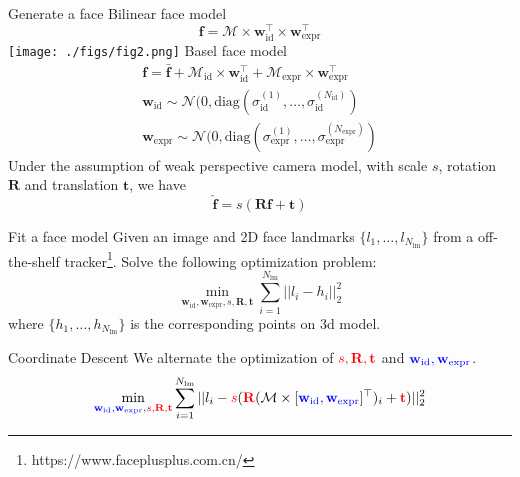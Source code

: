 \documentclass{beamer}
\begin{document}
\begin{frame}[allowframebreaks]{Generate a face}
Bilinear face model\cite{vlasic2005face}
$$\mathbf{f} = \mathcal{M} \times \mathbf{w}_{\text{id}}^\top \times \mathbf{w}_{\text{expr}}^\top$$
\texttt{[image: ./figs/fig2.png]}
Basel face model\cite{gerig2017morphable}
\begin{align*}
\mathbf{f} = \bar{\mathbf{f}} + \mathcal{M}_{\text{id}} \times \mathbf{w}_{\text{id}}^\top + \mathcal{M}_{\text{expr}}\times \mathbf{w}_{\text{expr}}^\top \\
\mathbf{w}_{\text{id}} \sim \mathcal{N}(0, \text{diag}(\sigma_{\text{id}}^{(1)}, \dots, \sigma_{\text{id}}^{(N_\text{id})}) \\ 
\mathbf{w}_{\text{expr}} \sim \mathcal{N}(0, \text{diag}(\sigma_{\text{expr}}^{(1)}, \dots, \sigma_{\text{expr}}^{(N_\text{expr})})
\end{align*}
Under the assumption of weak perspective camera model, with scale $s$, rotation $\mathbf{R}$ and translation $\mathbf{t}$, we have 
$$\hat{\mathbf{f}} = s (\mathbf{R} \mathbf{f} + \mathbf{t})$$

\end{frame}

\begin{frame}{Fit a face model}
Given an image and 2D face landmarks $\{l_1, \dots, l_{N_{\text{lm}}}\}$ from a off-the-shelf tracker\footnote{https://www.faceplusplus.com.cn/}. Solve the following optimization problem:
$$\min_{\mathbf{w}_{\text{id}}, \mathbf{w}_{\text{expr}}, s, \mathbf{R}, \mathbf{t}} \sum_{i=1}^{N_{\text{lm}}}||l_i - h_i||_2^2$$
where $\{h_1, \dots, h_{N_{\text{lm}}}\}$ is the corresponding points on 3d model.

\end{frame}


\begin{frame}{Coordinate Descent}
We alternate the optimization of $\color{red}{s, \mathbf{R}, \mathbf{t}}$ and $\color{blue}{\mathbf{w}_{\text{id}}, \mathbf{w}_{\text{expr}}}$.
$$\min_{\color{blue}{\mathbf{w}_{\text{id}}, \mathbf{w}_{\text{expr}}}, \color{red}{s, \mathbf{R}, \mathbf{t}}} \sum_{i=1}^{N_{\text{lm}}}||l_i - \color{red}{s}\color{black}(\color{red}\mathbf{R}\color{black}(\mathcal{M} \times [\color{blue}{\mathbf{w}_{\text{id}}, \mathbf{w}_{\text{expr}}} \color{black}]^\top)_i + \color{red}{\mathbf{t}} \color{black})||_2^2$$
\end{frame}
\end{document}
